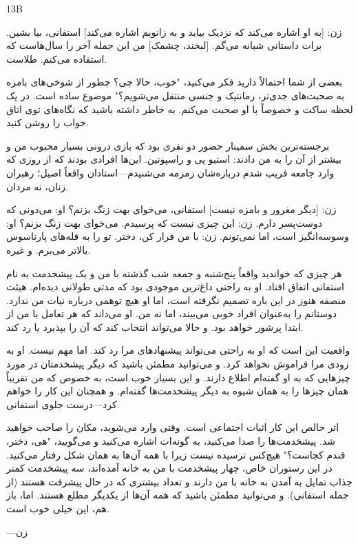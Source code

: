 13B

زن: [به او اشاره می‌کند که نزدیک بیاید و به زانویم اشاره می‌کند] استفانی، بیا بشین. برات داستانی شبانه می‌گم. [لبخند، چشمک] من این جمله آخر را سال‌هاست که استفاده می‌کنم. طلاست.

بعضی از شما احتمالاً دارید فکر می‌کنید، "خوب، حالا چی؟ چطور از شوخی‌های بامزه به صحبت‌های جدی‌تر، رمانتیک و جنسی منتقل می‌شویم؟" موضوع ساده است. در یک لحظه ساکت و خصوصاً با او صحبت می‌کنم. به خاطر داشته باشید که نگاه‌های توی اتاق خواب را روشن کنید.

برجسته‌ترین بخش سمینار حضور دو نفری بود که بازی درونی بسیار محبوب من و بیشتر از آن را به من دادند: استیو پی و راسپوتین. این‌ها افرادی بودند که از روزی که وارد جامعه فریب شدم درباره‌شان زمزمه می‌شنیدم—استادان واقعاً اصیل؛ رهبران زنان، نه مردان.

زن: [دیگر مغرور و بامزه نیست] استفانی، می‌خوای بهت زنگ بزنم؟  
او: می‌دونی که دوست‌پسر دارم.  
زن: این چیزی نیست که پرسیدم. می‌خوای بهت زنگ بزنم؟  
او: وسوسه‌انگیز است، اما نمی‌تونم.  
زن: با من فرار کن، دختر. تو را به قله‌های پارناسوس بالاتر می‌برم. و غیره.  

هر چیزی که خواندید واقعاً پنج‌شنبه و جمعه شب گذشته با من و یک پیشخدمت به نام استفانی اتفاق افتاد. او به راحتی داغ‌ترین موجودی بود که مدتی طولانی دیده‌ام. هیئت منصفه هنوز در این باره تصمیم نگرفته است، اما او هیچ توهمی درباره نیات من ندارد. دوستانم را به‌عنوان افراد خوبی می‌بیند، اما نه من. او می‌داند که هر تعامل با من از ابتدا پرشور خواهد بود. و حالا می‌تواند انتخاب کند که آن را بپذیرد یا رد کند.

واقعیت این است که او به راحتی می‌تواند پیشنهادهای مرا رد کند. اما مهم نیست. او به زودی مرا فراموش نخواهد کرد. و می‌توانید مطمئن باشید که دیگر پیشخدمتان در مورد چیزهایی که به او گفته‌ام اطلاع دارند. و این بسیار خوب است، به خصوص که من تقریباً همان چیزها را به همان شیوه به دیگر پیشخدمت‌ها گفته‌ام. و همچنان این کار را خواهم کرد—درست جلوی استفانی.

اثر خالص این کار اثبات اجتماعی است. وقتی وارد می‌شوید، مکان را صاحب خواهید شد. پیشخدمت‌ها را صدا می‌کنید، به گونه‌ات اشاره می‌کنید و می‌گویید، "هی، دختر، قندم کجاست؟" هیچ‌کس ترسیده نیست زیرا با همه آن‌ها به همان شکل رفتار می‌کنید. در این رستوران خاص، چهار پیشخدمت با من به خانه آمده‌اند، سه پیشخدمت کمتر جذاب تمایل به آمدن به خانه با من دارند و تعداد بیشتری که در حال پیشرفت هستند (از جمله استفانی). و می‌توانید مطمئن باشید که همه آن‌ها از یکدیگر مطلع هستند. اما، باز هم، این خیلی خوب است.

—زن